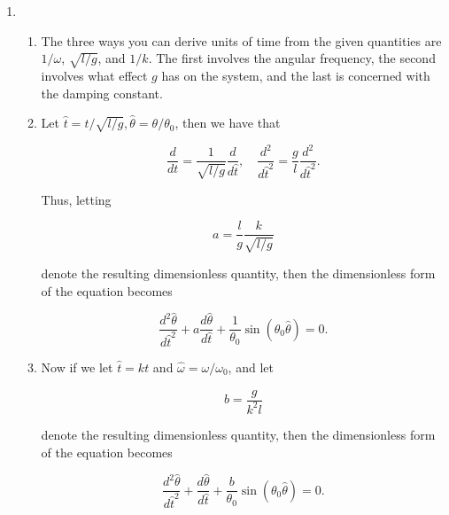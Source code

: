 \documentclass[12pt]{article}
\makeatletter
\theoremstyle{definition}
\theoremstyle{remark}
\newenvironment{solution}[1][\bf{\textit{Solution}}]{\par
  
  \normalfont \topsep6\p@\@plus6\p@\relax
  \list{}{\leftmargin=0mm
          \rightmargin=0mm
          \settowidth{\itemindent}{\itshape#1}%
          \labelwidth=\itemindent
          \parsep=0pt \listparindent=\parindent 
  }
  \item[\hskip\labelsep
        \itshape
    #1\@addpunct{.}]\ignorespaces
}{%
  \popQED\endlist\@endpefalse
}
\makeatother
\begin{document}
\begin{enumerate}[leftmargin=*]
    \begin{solution}\hfill
        \begin{enumerate}[label=\alph*)]
            \item The three ways you can derive units of time from the given quantities are $1/\omega$, $\sqrt{l/g}$, and $1/k$. The first involves the angular frequency, the second involves what effect $g$ has on the system, and the last is concerned with the damping constant.
            
            \item Let $\hat{t}=t/\sqrt{l/g}, \hat{ \theta}=\theta/\theta_0$, then we have that 
            
            \begin{equation*}
                \frac{d}{dt}=\frac{1}{\sqrt{l/g}}\frac{d}{d\hat{t}}, \quad \frac{d^2}{d\hat{t}^2}=\frac{g}{l}\frac{d^2}{d\hat{t}^2}.
            \end{equation*}
            
            Thus, letting 
            
            \begin{equation*}
                a=\frac{l}{g}\frac{k}{\sqrt{l/g}}
            \end{equation*}
            
            denote the resulting dimensionless quantity, then the dimensionless form of the equation becomes
            
            \begin{equation*}
                \frac{d^2\hat{\theta}}{d\hat{t}^2}+a\frac{d\hat{\theta}}{d\hat{t}}+\frac{1}{\theta_0}\sin{(\theta_0\hat{\theta})}=0.
            \end{equation*}
            
            \item Now if we let $\hat{t}=kt$ and $\hat{\omega}=\omega/\omega_0$, and let 
            
            \begin{equation*}
                b=\frac{g}{k^2l}
            \end{equation*}
            
            denote the resulting dimensionless quantity, then the dimensionless form of the equation becomes
            
            \begin{equation*}
                \frac{d^2\hat{\theta}}{d\hat{t}^2}+\frac{d\hat{\theta}}{d\hat{t}}+\frac{b}{\theta_0}\sin{(\theta_0\hat{\theta})}=0.
            \end{equation*}
        \end{enumerate}
    \end{solution}
    

\end{enumerate}
\end{document}
